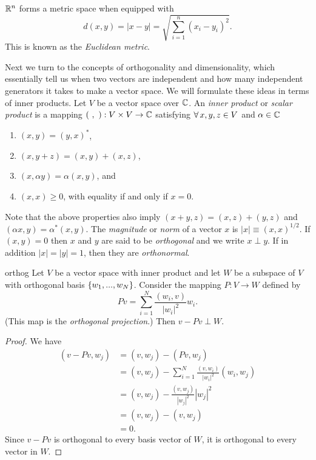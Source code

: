 \begin{example*}{}{}
 $\mathbb{R}^n$ forms a metric space when equipped with
  \begin{equation}
    d(x,y)=|x-y|=\sqrt{\sum\limits_{i=1}^n(x_i-y_i)^2}.
  \end{equation}
  This is known as the {\it Euclidean metric}.
\end{example*}


Next we turn to the concepts of orthogonality and dimensionality, which
essentially tell us when two vectors are independent and how many independent
generators it takes to make a vector space.
We will formulate these ideas in terms of inner products.
  Let $V$ be a vector space over $\mathbb{C}$. An {\it inner
  product} or {\it scalar product} is a mapping
  $(\ ,\ ):V\times V\to \C$
  satisfying $\operatorname{\forall} x,y,z\in V$ and $\alpha \in \mathbb{C}$
  \begin{enumerate}
    \item $(x,y)=(y,x)^{*}$,
    \item $(x,y+z)=(x,y)+(x,z)$,
    \item $(x,\alpha y)=\alpha(x,y)$, and
    \item $(x,x)\geq0$, with equality if and only if $x=0$.
  \end{enumerate}
  Note that the above properties also imply $(x+y,z)=(x,z)+(y,z)$ and
  $(\alpha x,y)=\alpha^{*}(x,y)$. The {\it magnitude} or {\it norm}
  of a vector $x$ is $|x|\equiv(x,x)^{1/2}$. If $(x,y)=0$ then $x$
  and $y$ are said to be {\it orthogonal} and we write $x\perp y$.
  If in addition $|x|=|y|=1$, then they are {\it orthonormal}.

\begin{proposition}{}{orthog}
  Let $V$ be a vector space with inner product and let $W$ be a subspace
  of $V$ with orthogonal basis $\left\{w_1,...,w_N\right\}$. Consider the mapping
  $P:V\to W$ defined by
  $$
    Pv=\sum_{i=1}^N\frac{(w_i,v)}{|w_i|^2}w_i.
  $$
  (This map is the {\it orthogonal
  projection}.)
  Then $v-Pv\perp W.$
  \begin{proof}
    We have
    \begin{equation*}
      \begin{aligned}
        (v-Pv,w_j)&=(v,w_j)-(Pv,w_j)\\
          &=(v,w_j)-\sum_{i=1}^N\frac{(v,w_i)}{|w_i|^2}(w_i,w_j)\\
          &=(v,w_j)-\frac{(v,w_j)}{|w_j|^2}|w_j|^2\\
          &=(v,w_j)-(v,w_j)\\
          &=0.
      \end{aligned}
    \end{equation*}
    Since $v-Pv$ is orthogonal to every basis vector of $W$, it is
    orthogonal to every vector in $W$.
  \end{proof}
\end{proposition}

